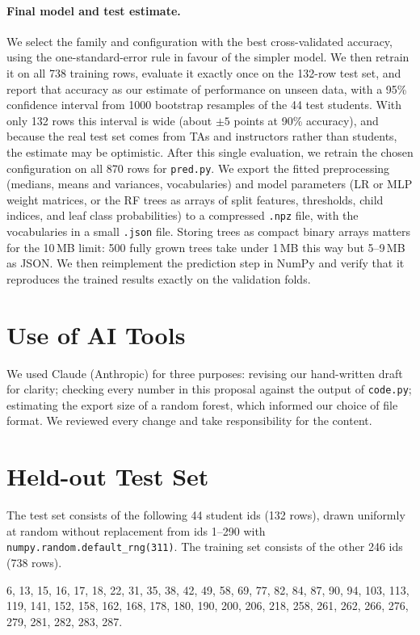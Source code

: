\documentclass[11pt,titlepage]{article}
\begin{document}
\paragraph{Final model and test estimate.}
We select the family and configuration with the best cross-validated accuracy, using
the one-standard-error rule in favour of the simpler model. We then retrain it on
all 738 training rows, evaluate it exactly once on the 132-row test set, and report
that accuracy as our estimate of performance on unseen data, with a 95\% confidence
interval from 1000 bootstrap resamples of the 44 test students. With only 132 rows
this interval is wide (about $\pm 5$ points at 90\% accuracy), and because the real
test set comes from TAs and instructors rather than students, the estimate may be
optimistic. After this single evaluation, we retrain the chosen configuration on
all 870 rows for \texttt{pred.py}. We export the fitted preprocessing (medians,
means and variances, vocabularies) and model parameters (LR or MLP weight matrices,
or the RF trees as arrays of split features, thresholds, child indices, and leaf
class probabilities) to a compressed \texttt{.npz} file, with the vocabularies in a
small \texttt{.json} file. Storing trees as compact binary arrays matters for the
10\,MB limit: 500 fully grown trees take under 1\,MB this way but 5--9\,MB as JSON.
We then reimplement the prediction step in NumPy and verify that it reproduces the
trained results exactly on the validation folds.


\section*{Use of AI Tools}
We used Claude (Anthropic) for three purposes: revising our hand-written draft for
clarity; checking every number in this proposal against the output of
\texttt{code.py}; estimating the export size of a random forest, which
informed our choice of file format. We reviewed every change and take
responsibility for the content.

\appendix
\section{Held-out Test Set}\label{app:test-ids}
The test set consists of the following 44 student ids (132 rows), drawn uniformly
at random without replacement from ids 1--290 with
\texttt{numpy.random.default\_rng(311)}. The training set consists of the other
246 ids (738 rows).

\medskip
\noindent\small
6, 13, 15, 16, 17, 18, 22, 31, 35, 38, 42, 49, 58, 69, 77, 82, 84, 87, 90, 94, 103, 113, 119, 141, 152, 158, 162, 168, 178, 180, 190, 200, 206, 218, 258, 261, 262, 266, 276, 279, 281, 282, 283, 287.
\normalsize
\end{document}
